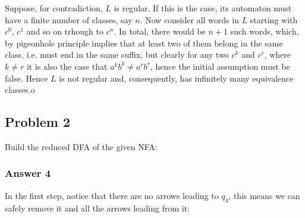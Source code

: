 \documentclass[11pt]{article}
\begin{document}
Suppose, for contradiction, \(L\) is regular.  If this is the case, its
automaton must have a finite number of classes, say \(n\).  Now consider all
words in \(L\) starting with \(c^0\), \(c^1\) and so on trhough to \(c^n\).  In
total, there would be \(n+1\) such words, which, by pigeonhole principle
implies that at least two of them belong in the same class, i.e. must end in
the same suffix, but clearly for any two \(c^k\) and \(c^r\), where \(k \neq r\)
it is also the case that \(a^kb^k \neq a^rb^r\), hence the initial assumption
must be false.  Hence \(L\) is not regular and, consequently, has infinitely
many equivalence classes.o

\subsection{Problem 2}
\label{sec:orgheadline6}
Build the reduced DFA of the given NFA:


\subsubsection{Answer 4}
\label{sec:orgheadline5}
In the first step, notice that there are no arrows leading to \(q_4\), this
means we can safely remove it and all the arrows leading from it:
\end{document}
